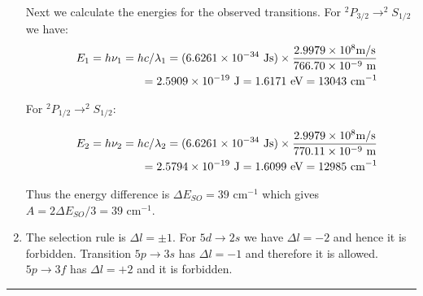\begin{enumerate}
Next we calculate the energies for the observed transitions. For $^2P_{3/2}\rightarrow ^2S_{1/2}$ we have:
\begin{eqnarray}
\nonumber
& & E_1 = h\nu_1 = hc / \lambda_1 = (6.6261\times 10^{-34}\textnormal{ Js})\times\frac{2.9979\times 10^8\textnormal{m/s}}{766.70\times 10^{-9}\textnormal{ m}}\\
\nonumber
& &  = 2.5909\times 10^{-19}\textnormal{ J} = 1.6171\textnormal{ eV} = 13043\textnormal{ cm}^{-1}
\end{eqnarray}

For $^2P_{1/2}\rightarrow ^2S_{1/2}$:

\begin{eqnarray}
\nonumber
& & E_2 = h\nu_2 = hc / \lambda_2 = (6.6261\times 10^{-34}\textnormal{ Js})\times\frac{2.9979\times 10^8\textnormal{m/s}}{770.11\times 10^{-9}\textnormal{ m}}\\
\nonumber
& &  = 2.5794\times 10^{-19}\textnormal{ J} = 1.6099\textnormal{ eV} = 12985\textnormal{ cm}^{-1}
\end{eqnarray}

Thus the energy difference is $\Delta E_{SO} = 39$ cm$^{-1}$ which gives $A = 2\Delta E_{SO} / 3 = 39$ cm$^{-1}$.

\item The selection rule is $\Delta l = \pm 1$. For $5d\rightarrow 2s$ we have $\Delta l = -2$ and hence it is forbidden. Transition $5p\rightarrow 3s$ has $\Delta l = -1$ and therefore it is allowed. $5p\rightarrow 3f$ has $\Delta l = +2$ and it is forbidden.

\end{enumerate}

\hrule\vspace{0.5cm}
